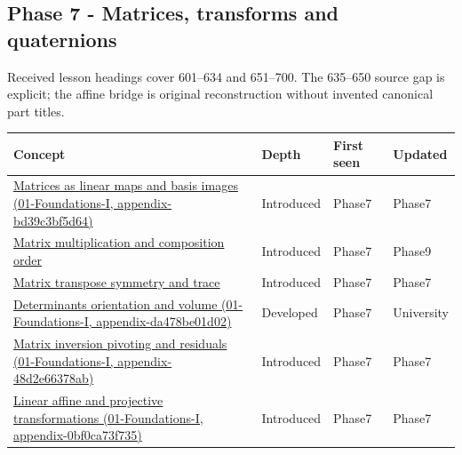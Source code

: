 \subsection{Phase 7 - Matrices, transforms and quaternions}\label{phase-7---matrices-transforms-and-quaternions}

Received lesson headings cover 601--634 and 651--700. The 635--650 source gap is explicit; the affine bridge is original reconstruction without invented canonical part titles.

{\def\LTcaptype{none} %
\begin{longtable}[]{@{}
  >{\raggedright\arraybackslash}p{}
  >{\raggedright\arraybackslash}p{}
  >{\raggedright\arraybackslash}p{}
  >{\raggedright\arraybackslash}p{}@{}}
\toprule\noalign{}
\begin{minipage}[b]{\linewidth}\raggedright
Concept
\end{minipage} & \begin{minipage}[b]{\linewidth}\raggedright
Depth
\end{minipage} & \begin{minipage}[b]{\linewidth}\raggedright
First seen
\end{minipage} & \begin{minipage}[b]{\linewidth}\raggedright
Updated
\end{minipage} \\
\midrule\noalign{}
\endhead
\bottomrule\noalign{}
\endlastfoot
\href{}{Matrices as linear maps and basis images (01-Foundations-I, appendix-bd39c3bf5d64)} & Introduced & Phase7 & Phase7 \\
\hyperref[appendix-ab31ef447dbf]{Matrix multiplication and composition order} & Introduced & Phase7 & Phase9 \\
\hyperref[appendix-175ca5ff874d]{Matrix transpose symmetry and trace} & Introduced & Phase7 & Phase7 \\
\href{}{Determinants orientation and volume (01-Foundations-I, appendix-da478be01d02)} & Developed & Phase7 & University \\
\href{}{Matrix inversion pivoting and residuals (01-Foundations-I, appendix-48d2e66378ab)} & Introduced & Phase7 & Phase7 \\
\href{}{Linear affine and projective transformations (01-Foundations-I, appendix-0bf0ca73f735)} & Introduced & Phase7 & Phase7 \\

\end{longtable}}
